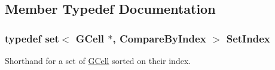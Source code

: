 \subsection{Member Typedef Documentation}
\hypertarget{classKatabatic_1_1GCell_aacb1c215b203bfba5729f135b3221d40}{
\subsubsection[{Set\-Index}]{\setlength{\rightskip}{0pt plus 5cm}typedef set$<$ {\bf G\-Cell} $\ast$, {\bf Compare\-By\-Index} $>$ {\bf Set\-Index}}}\label{classKatabatic_1_1GCell_aacb1c215b203bfba5729f135b3221d40}
Shorthand for a set of \hyperlink{classKatabatic_1_1GCell}{G\-Cell} sorted on their index. 

